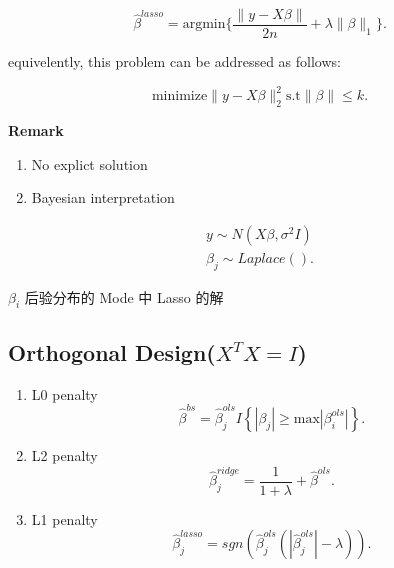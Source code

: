 \documentclass[UTF8]{ctexart}
\begin{document}
\[
    \hat{\beta} ^{lasso} = \text{argmin} \{ \frac{\|y-X\beta\|}{2n} + \lambda \|\beta\|_1\}
.\] 

equivelently, this problem can be addressed as follows:

\[
     \text{minimize} \|y - X\beta\|_2 ^{2} \text{s.t} \|\beta\| \le k
.\] 

\textbf{Remark}
\begin{enumerate}
    \item No explict solution
    \item Bayesian interpretation
\end{enumerate}

\begin{align*}
    y \sim N(X\beta, \sigma^2 I) \\
    \beta_j \sim Laplace()
.\end{align*}

$\beta _{i}$ 后验分布的 Mode  中 Lasso 的解

\subsection{Orthogonal Design($X^TX=I$)}%
\label{sub:orthogonal_design}

\begin{enumerate}
    \item L0 penalty
        \[
            \hat{\beta} ^{bs} = \hat{\beta} _{j} ^{ols} I \left\{ \left| \beta _{j} \right| \ge \text{max} \left| \beta _{i} ^{ols} \right| \right\} 
        .\] 
    \item L2 penalty
        \[
            \hat{\beta} ^{ridge} _{j} = \frac{1}{1+\lambda}  + \hat{\beta} ^{ols}
        .\] 
    \item L1 penalty
        \[
            \hat{\beta} _{j} ^{lasso} = sgn\left( \hat{\beta} _j ^{ols} \left(\left| \hat{\beta}_j ^{ols} \right| - \lambda   \right)   \right) 
        .\] 
\end{enumerate}
\end{document}
